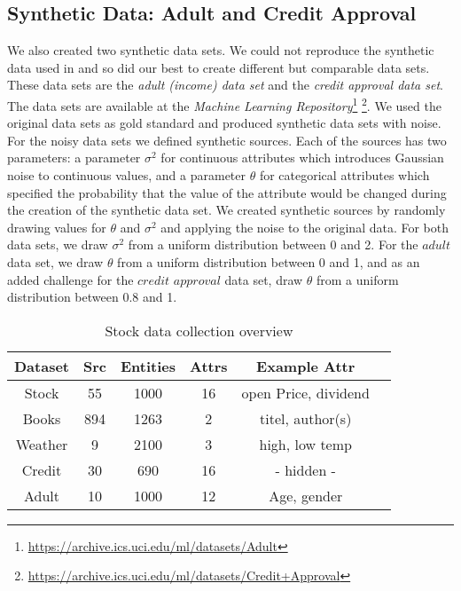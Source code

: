 \documentclass{acm_proc_article-sp}
\begin{document}
\subsection{Synthetic Data: Adult and Credit Approval} \label{sec:synth}

We also created two synthetic data sets. We could not reproduce the synthetic data used in \cite{li:resolving} and so did our best to create different but comparable data sets. These data sets are the \emph{adult (income) data set} and the \emph{credit approval data set}. The data sets are available at the \emph{Machine Learning Repository}\footnote{\url{https://archive.ics.uci.edu/ml/datasets/Adult}}
\footnote{\url{https://archive.ics.uci.edu/ml/datasets/Credit+Approval}}. We used the original data sets as gold standard and produced synthetic data sets with noise. For the noisy data sets we defined synthetic sources. Each of the sources has two parameters: a parameter $\sigma^2$ for continuous attributes which introduces Gaussian noise to continuous values, and a parameter $\theta$ for categorical attributes which specified the probability that the value of the attribute would be changed during the creation of the synthetic data set. We created synthetic sources by randomly drawing values for $\theta$ and $\sigma^2$ and applying the noise to the original data. For both data sets, we draw $\sigma^2$ from a uniform distribution between 0 and 2. For the $adult$ data set, we draw $\theta$ from a uniform distribution between 0 and 1, and as an added challenge for the $credit$ $approval$ data set, draw $\theta$ from a uniform distribution between $0.8$ and 1. 

\begin{table}[h] 
    \centering
{%
\begin{tabular}{  | c | c | c | c  | c | c |}		
\hline
\textbf{Dataset} & \textbf{Src} &  \textbf{Entities} & \textbf{Attrs}  & \textbf{Example Attr}  \\
\hline
 Stock & 55 &   1000 & 16 &  open Price, dividend   \\
 Books & 894 &   1263 & 2 &  titel, author(s)   \\
 Weather & 9 &   2100 & 3 &  high, low temp   \\
 Credit & 30 &   690 & 16 &  - hidden -   \\
 Adult & 10 &   1000 & 12 &  Age, gender   \\
\hline
\end{tabular}
}
 \caption{Stock data collection overview}%
    \label{fig:stock}%
\end{table}
\end{document}
